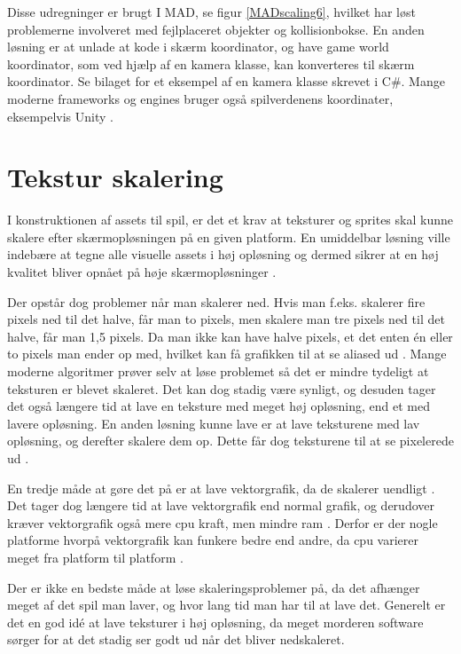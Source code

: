 \documentclass[Main.tex]{PositionOgSkalering}
\begin{document}
Disse udregninger er brugt I MAD, se figur \ref{MADscaling6}, hvilket har løst problemerne involveret med fejlplaceret objekter og kollisionbokse.
En anden løsning er at unlade at kode i skærm koordinator, og have game world koordinator, som ved hjælp af en kamera klasse, kan konverteres til skærm koordinator. Se bilaget for et eksempel af en kamera klasse skrevet i C\#.
Mange moderne frameworks og engines bruger også spilverdenens koordinater, eksempelvis Unity \cite{unity3d}.

\section{Tekstur skalering}
I konstruktionen af assets til spil, er det et krav at teksturer og sprites skal kunne skalere efter skærmopløsningen på en given platform. En umiddelbar løsning ville indebære at tegne alle visuelle assets i høj opløsning og dermed sikrer at en høj kvalitet bliver opnået på høje skærmopløsninger \cite{deepworldgame}.

Der opstår dog problemer når man skalerer ned. Hvis man f.eks. skalerer fire pixels ned til det halve, får man to pixels, men skalere man tre pixels ned til det halve, får man 1,5 pixels. Da man ikke kan have halve pixels, et det enten én eller to pixels man ender op med, hvilket kan få grafikken til at se aliased ud \cite{Martin}. Mange moderne algoritmer prøver selv at løse problemet så det er mindre tydeligt at teksturen er blevet skaleret.\cite{Kopf} Det kan dog stadig være synligt, og desuden tager det også længere tid at lave en teksture med meget høj opløsning, end et med lavere opløsning. En anden løsning  kunne lave er at lave teksturene med lav opløsning, og derefter skalere dem op. Dette får dog teksturene til at se pixelerede ud \cite{McHugh}.

En tredje måde at gøre det på er at lave vektorgrafik, da de skalerer uendligt \cite{deepworldgame}. Det tager dog længere tid at lave vektorgrafik end normal grafik,\cite{deepworldgame} og derudover kræver vektorgrafik også mere cpu kraft, men mindre ram \cite{deepworldgame}. Derfor er der nogle platforme hvorpå vektorgrafik kan funkere bedre end andre, da cpu varierer meget fra platform til platform \cite{PassMark}.

Der er ikke en bedste måde at løse skaleringsproblemer på, da det afhænger meget af det spil man laver, og hvor lang tid man har til at lave det. Generelt er det en god idé at lave teksturer i høj opløsning, da meget morderen software sørger for at det stadig ser godt ud når det bliver nedskaleret.
\end{document}
